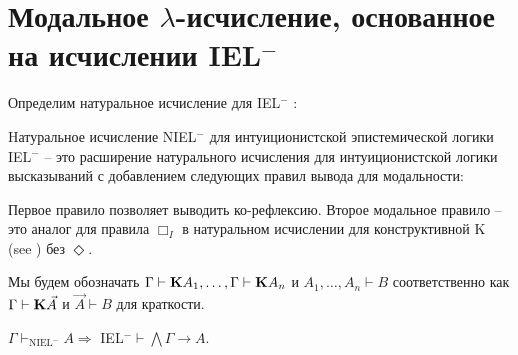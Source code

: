 \section{Модальное $\lambda$-исчисление, основанное на исчислении IEL$^{-}$}

Определим натуральное исчисление для IEL$^{-}$ :

\begin{defin} Hатуральное исчисление NIEL$^{-}$ для интуиционистской эпистемической логики IEL$^{-}$ -- это
расширение натурального исчисления для интуиционистской логики высказываний с добавлением следующих правил вывода для модальности:

\begin{minipage}{0.5\textwidth}
  \begin{flushleft}
  \begin{prooftree}
\end{prooftree}
  \end{flushleft}
\end{minipage}
\begin{minipage}{0.5\textwidth}
  \begin{flushright}
  \begin{prooftree}
  \end{prooftree}
  \end{flushright}
\end{minipage}
\end{defin}

Первое правило позволяет выводить ко-рефлексию. Второе модальное правило -- это аналог для правила $\Box_I$
в натуральном исчислении для конструктивной K (see \cite{ModalLa}) без $\Diamond$.

Мы будем обозначать $\Gamma \vdash {\bf K} A_1, \dots, \Gamma \vdash {\bf K} A_n$ и $A_1,\dots,A_n \vdash B$ соответственно как $\Gamma \vdash {\bf K} \vec{A}$ и $\vec{A} \vdash B$ для краткости.

\vspace{\baselineskip}

\begin{lemma}
  $\Gamma \vdash_{\text{NIEL}^{-}} A \Rightarrow$ IEL$^{-} \vdash \bigwedge \Gamma \rightarrow A$.
\end{lemma}

